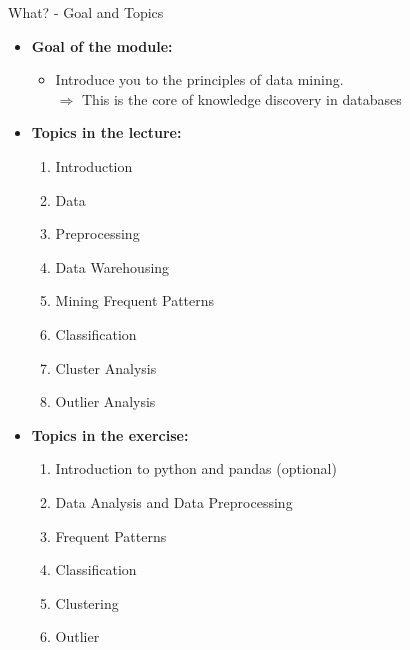 \begin{frame}{What? - Goal and Topics}
	\begin{itemize}
		\item \textbf{Goal of the module:}
		      \begin{itemize}
			      \item Introduce you to the principles of data mining. \\
			            $\Rightarrow$ This is the core of knowledge discovery in databases
		      \end{itemize}
		\item \textbf{Topics in the lecture:}
		      \vspace*{-1\multicolsep}
		      \begin{multicols}{2}
			      \begin{enumerate}
				      \item Introduction
				      \item Data
				      \item Preprocessing
				      \item Data Warehousing
				      \item Mining Frequent Patterns
				      \item Classification
				      \item Cluster Analysis
				      \item Outlier Analysis
			      \end{enumerate}
		      \end{multicols}
		      \vspace*{-0.75\multicolsep}
		\item \textbf{Topics in the exercise:}
		      \vspace*{-1\multicolsep}
		      \begin{multicols}{2}
			      \begin{enumerate}
				      \item Introduction to python and pandas {\color{gray}(optional)}
				      \item Data Analysis and Data Preprocessing
				      \item Frequent Patterns
				      \item Classification
				      \item Clustering
				      \item Outlier

\end{enumerate}
\end{multicols}
\end{itemize}
\end{frame}
